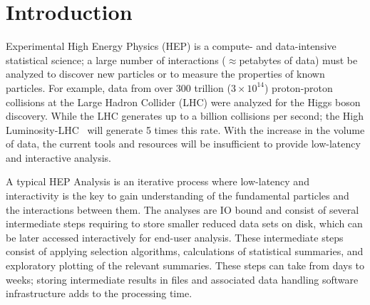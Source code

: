 \section{Introduction}
\label{sec:intro}
\squeezeup

 
Experimental High Energy Physics (HEP) is a compute- and data-intensive statistical science; 
a large number of interactions ($\approx$petabytes of data)
must be analyzed to discover new particles or to measure the properties of known particles. 
For example, data from over $300$ trillion ($3\times10^{14}$) proton-proton collisions at the 
Large Hadron Collider (LHC) were analyzed for the Higgs boson discovery. 
While the LHC generates up to a billion collisions per second; the High Luminosity-LHC~\cite{hllhc} will generate 5 times this rate.
With the increase in the volume of data, the current tools and resources will be insufficient to 
provide low-latency and interactive analysis. 

A typical HEP Analysis is an iterative process where low-latency and interactivity is the key to gain 
understanding of the fundamental particles and the interactions between them. 
The analyses are IO bound and consist of several intermediate steps requiring to store 
smaller reduced data sets on disk, which can be later accessed interactively for end-user analysis. 
These intermediate steps consist of applying selection algorithms, calculations of statistical summaries, 
and exploratory plotting of the relevant summaries. 
These steps can take from days to weeks; 
storing intermediate results in files and associated data handling software infrastructure 
adds to the processing time. 

